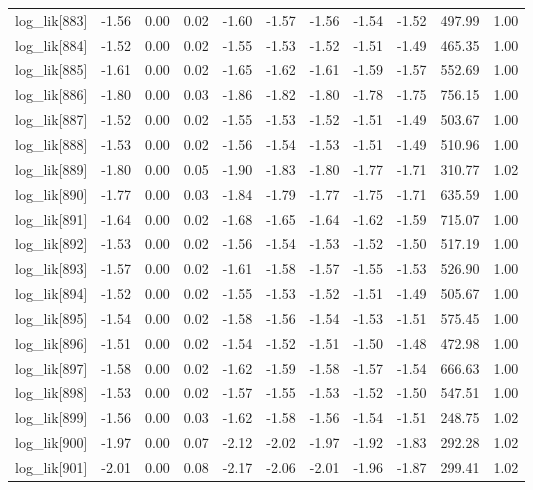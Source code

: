 \begin{table}[ht]
\begin{tabular}{rrrrrrrrrrr}
  log\_lik[883] & -1.56 & 0.00 & 0.02 & -1.60 & -1.57 & -1.56 & -1.54 & -1.52 & 497.99 & 1.00 \\ 
  log\_lik[884] & -1.52 & 0.00 & 0.02 & -1.55 & -1.53 & -1.52 & -1.51 & -1.49 & 465.35 & 1.00 \\ 
  log\_lik[885] & -1.61 & 0.00 & 0.02 & -1.65 & -1.62 & -1.61 & -1.59 & -1.57 & 552.69 & 1.00 \\ 
  log\_lik[886] & -1.80 & 0.00 & 0.03 & -1.86 & -1.82 & -1.80 & -1.78 & -1.75 & 756.15 & 1.00 \\ 
  log\_lik[887] & -1.52 & 0.00 & 0.02 & -1.55 & -1.53 & -1.52 & -1.51 & -1.49 & 503.67 & 1.00 \\ 
  log\_lik[888] & -1.53 & 0.00 & 0.02 & -1.56 & -1.54 & -1.53 & -1.51 & -1.49 & 510.96 & 1.00 \\ 
  log\_lik[889] & -1.80 & 0.00 & 0.05 & -1.90 & -1.83 & -1.80 & -1.77 & -1.71 & 310.77 & 1.02 \\ 
  log\_lik[890] & -1.77 & 0.00 & 0.03 & -1.84 & -1.79 & -1.77 & -1.75 & -1.71 & 635.59 & 1.00 \\ 
  log\_lik[891] & -1.64 & 0.00 & 0.02 & -1.68 & -1.65 & -1.64 & -1.62 & -1.59 & 715.07 & 1.00 \\ 
  log\_lik[892] & -1.53 & 0.00 & 0.02 & -1.56 & -1.54 & -1.53 & -1.52 & -1.50 & 517.19 & 1.00 \\ 
  log\_lik[893] & -1.57 & 0.00 & 0.02 & -1.61 & -1.58 & -1.57 & -1.55 & -1.53 & 526.90 & 1.00 \\ 
  log\_lik[894] & -1.52 & 0.00 & 0.02 & -1.55 & -1.53 & -1.52 & -1.51 & -1.49 & 505.67 & 1.00 \\ 
  log\_lik[895] & -1.54 & 0.00 & 0.02 & -1.58 & -1.56 & -1.54 & -1.53 & -1.51 & 575.45 & 1.00 \\ 
  log\_lik[896] & -1.51 & 0.00 & 0.02 & -1.54 & -1.52 & -1.51 & -1.50 & -1.48 & 472.98 & 1.00 \\ 
  log\_lik[897] & -1.58 & 0.00 & 0.02 & -1.62 & -1.59 & -1.58 & -1.57 & -1.54 & 666.63 & 1.00 \\ 
  log\_lik[898] & -1.53 & 0.00 & 0.02 & -1.57 & -1.55 & -1.53 & -1.52 & -1.50 & 547.51 & 1.00 \\ 
  log\_lik[899] & -1.56 & 0.00 & 0.03 & -1.62 & -1.58 & -1.56 & -1.54 & -1.51 & 248.75 & 1.02 \\ 
  log\_lik[900] & -1.97 & 0.00 & 0.07 & -2.12 & -2.02 & -1.97 & -1.92 & -1.83 & 292.28 & 1.02 \\ 
  log\_lik[901] & -2.01 & 0.00 & 0.08 & -2.17 & -2.06 & -2.01 & -1.96 & -1.87 & 299.41 & 1.02 \\ 

\end{tabular}
\end{table}
